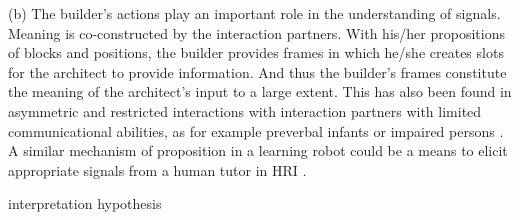 (b) The builder's actions play an important role in the understanding of signals. Meaning is co-constructed by the interaction partners. With his/her propositions of blocks and positions, the builder provides frames in which he/she creates slots for the architect to provide information. And thus the builder's frames constitute the meaning of the architect's input to a large extent. This has also been found in asymmetric and restricted interactions with interaction partners with limited communicational abilities, as for example preverbal infants or impaired persons \cite{ochs1979propositions, goodwin1995co}. A similar mechanism of proposition in a learning robot could be a means to elicit appropriate signals from a human tutor in HRI \cite{cakmak2012designing,vollmer2014robots,cangelosi2010integration}. 


interpretation hypothesis
